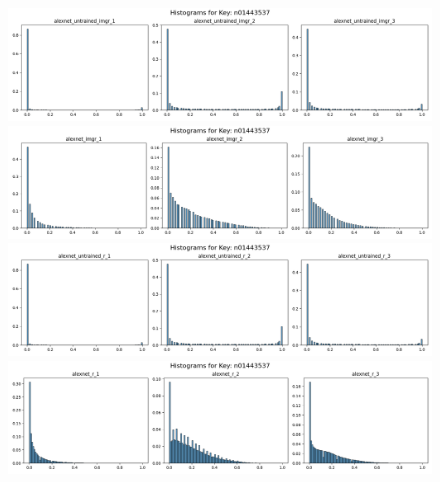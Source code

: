 \documentclass{article}
\begin{document}
    \begin{figure}[H]
        \centering
        \begin{minipage}{\textwidth}
            \centering
            \includegraphics[width=\textwidth]{alexnet_untrained_imgr_n01443537.png} %
            
        \end{minipage}\hfill
        \begin{minipage}{\textwidth}
            \centering
            \includegraphics[width=\textwidth]{alexnet_imgr_n01443537.png} %
        \end{minipage}
        \begin{minipage}{\textwidth}
            \centering
            \includegraphics[width=\textwidth]{alexnet_untrained_r_n01443537.png} %
            
        \end{minipage}\hfill
        \begin{minipage}{\textwidth}
            \centering
            \includegraphics[width=\textwidth]{alexnet_r_n01443537.png} %
        \end{minipage}
        

\end{figure}
\end{document}
